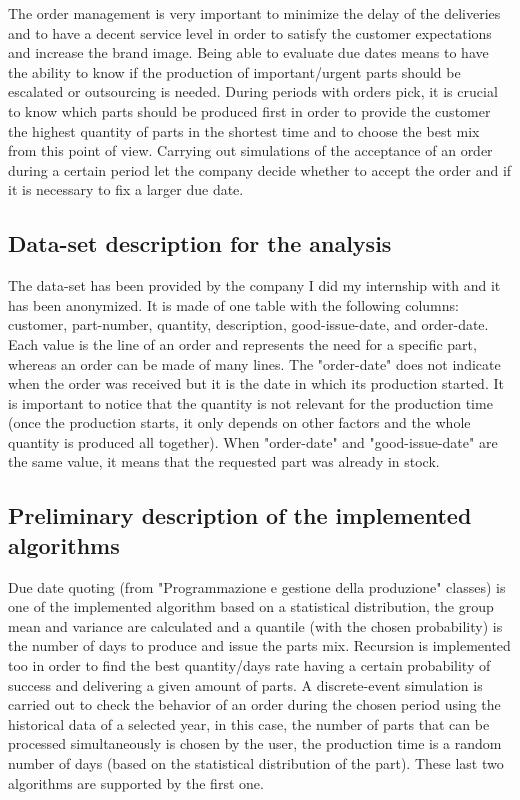 \documentclass[a4paper,12pt]{article}
\begin{document}
The order management is very important to minimize the delay of the deliveries and to have a decent service level in order to satisfy the customer expectations and increase the brand image. Being able to evaluate due dates means to have the ability to know if the production of important/urgent parts should be escalated or outsourcing is needed. During periods with orders pick, it is crucial to know which parts should be produced first in order to provide the customer the highest quantity of parts in the shortest time and to choose the best mix from this point of view. Carrying out simulations of the acceptance of an order during a certain period let the company decide whether to accept the order and if it is necessary to fix a larger due date.

\subsection{Data-set description for the analysis}

The data-set has been provided by the company I did my internship with and it has been anonymized. It is made of one table with the following columns: customer, part-number, quantity, description, good-issue-date, and order-date. Each value is the line of an order and represents the need for a specific part, whereas an order can be made of many lines. The "order-date" does not indicate when the order was received but it is the date in which its production started. It is important to notice that the quantity is not relevant for the production time (once the production starts, it only depends on other factors and the whole quantity is produced all together). When "order-date" and "good-issue-date" are the same value, it means that the requested part was already in stock.

\subsection{Preliminary description of the implemented algorithms}

Due date quoting (from "Programmazione e gestione della produzione" classes) is one of the implemented algorithm based on a statistical distribution, the group mean and variance are calculated and a quantile (with the chosen probability) is the number of days to produce and issue the parts mix. Recursion is implemented too in order to find the best quantity/days rate having a certain probability of success and delivering a given amount of parts. A discrete-event simulation is carried out to check the behavior of an order during the chosen period using the historical data of a selected year, in this case, the number of parts that can be processed simultaneously is chosen by the user, the production time is a random number of days (based on the statistical distribution of the part). These last two algorithms are supported by the first one.
\end{document}
